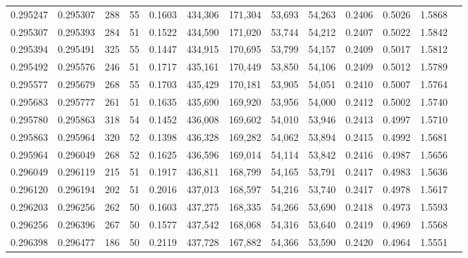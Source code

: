 \begin{tabular}{rrrrrrrrrrrrr}
0.295247 & 0.295307 &   288 &  55 &                                     0.1603 & 434,306 & 171,304 &  53,693 &  54,263 & 0.2406 & 0.5026 & 1.5868 \\
0.295307 & 0.295393 &   284 &  51 &                                     0.1522 & 434,590 & 171,020 &  53,744 &  54,212 & 0.2407 & 0.5022 & 1.5842 \\
0.295394 & 0.295491 &   325 &  55 &                                     0.1447 & 434,915 & 170,695 &  53,799 &  54,157 & 0.2409 & 0.5017 & 1.5812 \\
0.295492 & 0.295576 &   246 &  51 &                                     0.1717 & 435,161 & 170,449 &  53,850 &  54,106 & 0.2409 & 0.5012 & 1.5789 \\
0.295577 & 0.295679 &   268 &  55 &                                     0.1703 & 435,429 & 170,181 &  53,905 &  54,051 & 0.2410 & 0.5007 & 1.5764 \\
0.295683 & 0.295777 &   261 &  51 &                                     0.1635 & 435,690 & 169,920 &  53,956 &  54,000 & 0.2412 & 0.5002 & 1.5740 \\
0.295780 & 0.295863 &   318 &  54 &                                     0.1452 & 436,008 & 169,602 &  54,010 &  53,946 & 0.2413 & 0.4997 & 1.5710 \\
0.295863 & 0.295964 &   320 &  52 &                                     0.1398 & 436,328 & 169,282 &  54,062 &  53,894 & 0.2415 & 0.4992 & 1.5681 \\
0.295964 & 0.296049 &   268 &  52 &                                     0.1625 & 436,596 & 169,014 &  54,114 &  53,842 & 0.2416 & 0.4987 & 1.5656 \\
0.296049 & 0.296119 &   215 &  51 &                                     0.1917 & 436,811 & 168,799 &  54,165 &  53,791 & 0.2417 & 0.4983 & 1.5636 \\
0.296120 & 0.296194 &   202 &  51 &                                     0.2016 & 437,013 & 168,597 &  54,216 &  53,740 & 0.2417 & 0.4978 & 1.5617 \\
0.296203 & 0.296256 &   262 &  50 &                                     0.1603 & 437,275 & 168,335 &  54,266 &  53,690 & 0.2418 & 0.4973 & 1.5593 \\
0.296256 & 0.296396 &   267 &  50 &                                     0.1577 & 437,542 & 168,068 &  54,316 &  53,640 & 0.2419 & 0.4969 & 1.5568 \\
0.296398 & 0.296477 &   186 &  50 &                                     0.2119 & 437,728 & 167,882 &  54,366 &  53,590 & 0.2420 & 0.4964 & 1.5551 \\

\end{tabular}
